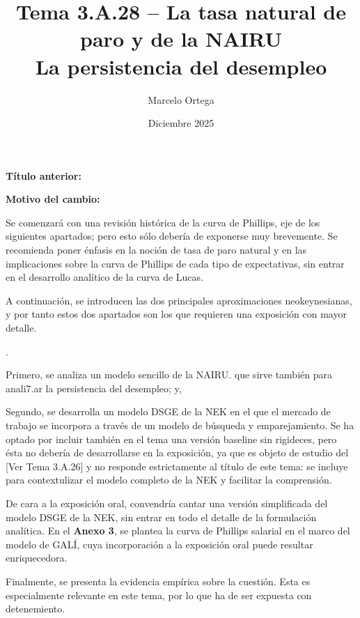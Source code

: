 \documentclass[10pt,a4paper]{article}
\title{Tema 3.A.28 -- La tasa natural de paro y de la NAIRU\\
\large La persistencia del desempleo}
\author{Marcelo Ortega}
\date{Diciembre 2025}
\newcounter{numitem}
\newcommand{\puntosclave}[1]{%
  \begin{tcolorbox}[
    colframe=black,
    title={Puntos clave},
    before upper={\setlength{\parindent}{0.5cm}\setlength{\parskip}{0.5\baselineskip}}
  ]
  #1
  \end{tcolorbox}
}
\newenvironment{lnum}
      {\begin{list}{\arabic{numitem}.}{%
          \usecounter{numitem}%
          \setlength{\leftmargin}{1cm}%
          \setlength{\parskip}{3pt}%
          \setlength{\itemsep}{0pt}%
          \setlength{\parsep}{0pt}%
      }}
      {\end{list}}
\newcommand{\changebox}{%
\begin{tcolorbox}[title={Historial de cambios del tema}]
\textbf{Título anterior:} \OldTitle\par
\textbf{Motivo del cambio:} \ChangeWhy
\end{tcolorbox}
}
\newcommand{\authorfont}[1]{{\fontfamily{EBGaramond-TLF}\selectfont #1}}
\begin{document}
\maketitle
\changebox

\newpage

\puntosclave{ %
    Se comenzará con una revisión histórica de la curva de Phillips, eje de los siguientes apartados; pero esto sólo debería de exponerse muy brevemente. Se recomienda poner énfasis en la noción de tasa de paro natural y en las implicaciones sobre la curva de Phillips de cada tipo de expectativas, sin entrar en el desarrollo analítico de la curva de Lucas.

    A continuación, se introducen las dos principales aproximaciones neokeynesianas, y por tanto estos dos apartados son los que requieren una exposición con mayor detalle.
    \begin{lnum}
        \item Primero, se analiza un modelo sencillo de la NAIRU. que sirve también para anali7.ar la persistencia del desempleo; y,
        \item Segundo, se desarrolla un modelo DSGE de la NEK en el que el mercado de trabajo se incorpora a través de un modelo de búsqueda y emparejamiento. Se ha optado por incluir también en el tema una versión baseline sin rigideces, pero ésta no debería de desarrollarse en la exposición, ya que es objeto de estudio del [\authorfont{Ver Tema 3.A.26}] y no responde estrictamente al título de este tema: se incluye para contextulizar el modelo completo de la NEK y facilitar la comprensión.
    \end{lnum}
    
    De cara a la exposición oral, convendría cantar una versión simplificada del modelo DSGE de la NEK, sin entrar en todo el detalle de la formulación analítica. En el \textbf{Anexo 3}, se plantea la curva de Phillips salarial en el marco del modelo de GALÍ, cuya incorporación a la exposición oral puede resultar enriquecedora.

    Finalmente, se presenta la evidencia empírica sobre la cuestión. Esta es especialmente relevante en este tema, por lo que ha de ser expuesta con detenemiento.
    }
\vspace{1cm}
\end{document}
